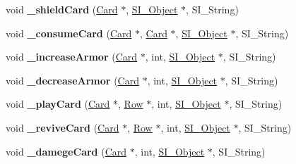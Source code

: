 \begin{DoxyCompactItemize}
\item 
\mbox{\label{class_field_a91648a7d2c403f7bfa8c60041e4b22a4}} 
void {\bfseries \+\_\+shield\+Card} (\hyperlink{class_card}{Card} $\ast$, \hyperlink{class_s_i___object}{S\+I\+\_\+\+Object} $\ast$, S\+I\+\_\+\+String)
\item 
\mbox{\label{class_field_a49da8e4b70c4826c7d10ad63bcd4ff41}} 
void {\bfseries \+\_\+consume\+Card} (\hyperlink{class_card}{Card} $\ast$, \hyperlink{class_card}{Card} $\ast$, \hyperlink{class_s_i___object}{S\+I\+\_\+\+Object} $\ast$, S\+I\+\_\+\+String)
\item 
\mbox{\label{class_field_acd9ce61bcfd5820d79560b205e74e97e}} 
void {\bfseries \+\_\+increase\+Armor} (\hyperlink{class_card}{Card} $\ast$, int, \hyperlink{class_s_i___object}{S\+I\+\_\+\+Object} $\ast$, S\+I\+\_\+\+String)
\item 
\mbox{\label{class_field_a3ba396e91a84d207f7952f0feac88a2b}} 
void {\bfseries \+\_\+decrease\+Armor} (\hyperlink{class_card}{Card} $\ast$, int, \hyperlink{class_s_i___object}{S\+I\+\_\+\+Object} $\ast$, S\+I\+\_\+\+String)
\item 
\mbox{\label{class_field_a142081723866709b8ba4cebad95df75d}} 
void {\bfseries \+\_\+play\+Card} (\hyperlink{class_card}{Card} $\ast$, \hyperlink{class_card_set}{Row} $\ast$, int, \hyperlink{class_s_i___object}{S\+I\+\_\+\+Object} $\ast$, S\+I\+\_\+\+String)
\item 
\mbox{\label{class_field_a4a5629965ccfd136dacd43ed85660052}} 
void {\bfseries \+\_\+revive\+Card} (\hyperlink{class_card}{Card} $\ast$, \hyperlink{class_card_set}{Row} $\ast$, int, \hyperlink{class_s_i___object}{S\+I\+\_\+\+Object} $\ast$, S\+I\+\_\+\+String)
\item 
\mbox{\label{class_field_a282a44f7439500e63c82614b218b066e}} 
void {\bfseries \+\_\+damege\+Card} (\hyperlink{class_card}{Card} $\ast$, int, \hyperlink{class_s_i___object}{S\+I\+\_\+\+Object} $\ast$, S\+I\+\_\+\+String)
\item 
\mbox{\label{class_field_a321a7886a7a9447f7a2c6b6ec8424cbc}} 

\end{DoxyCompactItemize}
